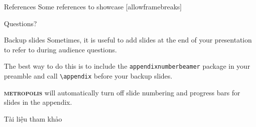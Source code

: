 \documentclass[10pt]{beamer}
\newcommand{\themename}{\textbf{\textsc{metropolis}}\xspace}
\begin{document}
\begin{frame}{References}
  Some references to showcase [allowframebreaks] \cite{durand2003loglog, flajolet2007hyperloglog, chabchoub2010sliding, ertl2024exaloglog, heule2013hyperloglog}
\end{frame}

\begin{frame}[standout]
  Questions?
\end{frame}

\appendix

\begin{frame}[fragile]{Backup slides}
  Sometimes, it is useful to add slides at the end of your presentation to
  refer to during audience questions.

  The best way to do this is to include the \verb|appendixnumberbeamer|
  package in your preamble and call \verb|\appendix| before your backup slides.

  \themename will automatically turn off slide numbering and progress bars for
  slides in the appendix.
\end{frame}

\begin{frame}[allowframebreaks]{Tài liệu tham khảo}
  
  
\end{frame}
\end{document}
